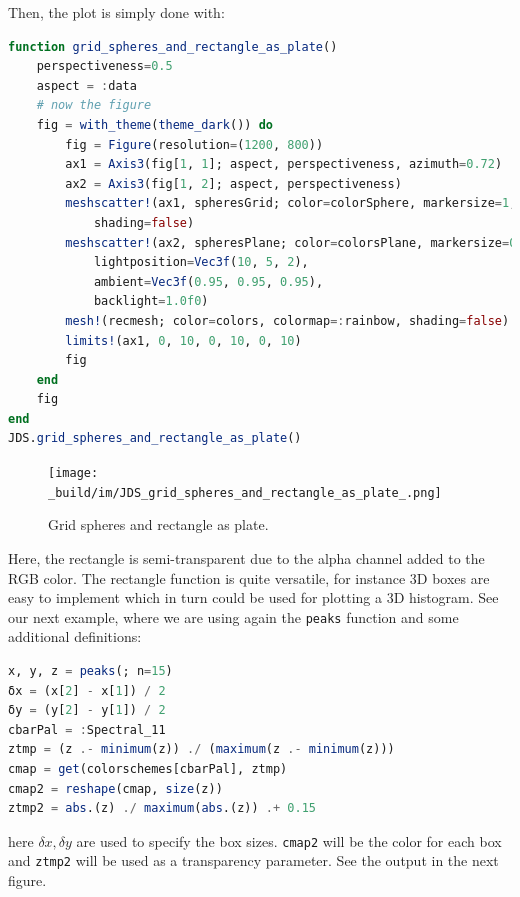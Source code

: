 \documentclass[
  notoc %
]{tufte-book}
\newcommand{\passthrough}[1]{#1}
\begin{document}
Then, the plot is simply done with:

\begin{lstlisting}[language=Julia]
function grid_spheres_and_rectangle_as_plate()
    perspectiveness=0.5
    aspect = :data
    # now the figure
    fig = with_theme(theme_dark()) do
        fig = Figure(resolution=(1200, 800))
        ax1 = Axis3(fig[1, 1]; aspect, perspectiveness, azimuth=0.72)
        ax2 = Axis3(fig[1, 2]; aspect, perspectiveness)
        meshscatter!(ax1, spheresGrid; color=colorSphere, markersize=1,
            shading=false)
        meshscatter!(ax2, spheresPlane; color=colorsPlane, markersize=0.75,
            lightposition=Vec3f(10, 5, 2),
            ambient=Vec3f(0.95, 0.95, 0.95),
            backlight=1.0f0)
        mesh!(recmesh; color=colors, colormap=:rainbow, shading=false)
        limits!(ax1, 0, 10, 0, 10, 0, 10)
        fig
    end
    fig
end
JDS.grid_spheres_and_rectangle_as_plate()
\end{lstlisting}

\begin{figure}
\hypertarget{fig:grid_spheres_and_rectangle_as_plate}{%
\centering
\texttt{[image: \_build/im/JDS\_grid\_spheres\_and\_rectangle\_as\_plate\_.png]}
\caption{Grid spheres and rectangle as
plate.}\label{fig:grid_spheres_and_rectangle_as_plate}
}
\end{figure}

Here, the rectangle is semi-transparent due to the alpha channel added
to the RGB color. The rectangle function is quite versatile, for
instance 3D boxes are easy to implement which in turn could be used for
plotting a 3D histogram. See our next example, where we are using again
the \passthrough{\lstinline!peaks!} function and some additional
definitions:

\begin{lstlisting}[language=Julia]
x, y, z = peaks(; n=15)
δx = (x[2] - x[1]) / 2
δy = (y[2] - y[1]) / 2
cbarPal = :Spectral_11
ztmp = (z .- minimum(z)) ./ (maximum(z .- minimum(z)))
cmap = get(colorschemes[cbarPal], ztmp)
cmap2 = reshape(cmap, size(z))
ztmp2 = abs.(z) ./ maximum(abs.(z)) .+ 0.15
\end{lstlisting}

here \(\delta x, \delta y\) are used to specify the box sizes.
\passthrough{\lstinline!cmap2!} will be the color for each box and
\passthrough{\lstinline!ztmp2!} will be used as a transparency
parameter. See the output in the next figure.
\end{document}
